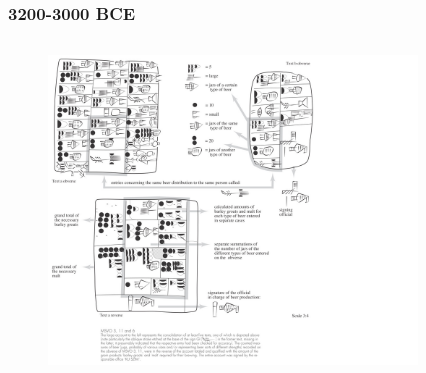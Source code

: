 \documentclass{beamer}
\begin{document}
\begin{frame}
   \frametitle{3200-3000 BCE}
   \begin{columns}
      \begin{column}{0.7\textwidth}
         \begin{figure}[htbp]
            \includegraphics[width=1.0\textwidth]{images/P005322_ld.jpg}
         \end{figure}
      \end{column}
      \hfill
      \begin{column}{0.4\textwidth}
         \begin{figure}[htbp]

\end{figure}
\end{column}
\end{columns}
\end{frame}
\end{document}
